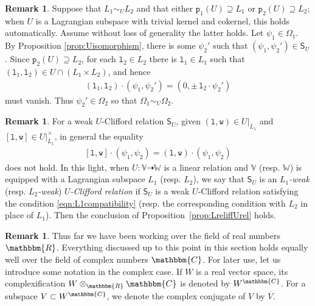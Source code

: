 \documentclass[a4paper, reqno, 11pt]{amsart}
\numberwithin{equation}{section}
\theoremstyle{definition}
\newtheorem{remark}[equation]{Remark}
\newcommand{\rmp}{\mathtt{p}}
\newcommand{\IC}{\mathbbm{C}}
\newcommand{\IR}{\mathbbm{R}}
\newcommand{\IV}{\mathbb{V}}
\newcommand{\IW}{\mathbb{W}}
\newcommand{\sfS}{{\mathsf{S}}}
\newcommand{\rel}{\dashrightarrow}
\theoremstyle{remark}
\begin{document}
\begin{remark}\label{rem:fullrankcase}
    Suppose that $L_1 \sim_U L_2$ and that either $\rmp_1(U) \supseteq L_1$ or $\rmp_2(U) \supseteq L_2$; when $U$ is a Lagrangian subspace with trivial kernel and cokernel, this holds automatically. Assume without loss of generality the latter holds. Let $\psi_1\in\Omega_1$.
    By Proposition \ref{prop:Uisomorphism}, there is some $\psi_2'$ such that $(\psi_1, \psi_2') \in \sfS_U$. Since $\rmp_2(U) \supseteq L_2$, for each $\texttt{l}_2 \in L_2$ there is $\texttt{l}_1 \in L_1$ such that $(\texttt{l}_1, \texttt{l}_2) \in U\cap (L_1 \times L_2)$, and hence
    \begin{align}
        (\texttt{l}_1, \texttt{l}_2) \cdot (\psi_1, \psi_2') = (0, \pm\,\texttt{l}_2 \cdot \psi_2')
    \end{align}
    must vanish. Thus $\psi_2' \in \Omega_2$ so that $\Omega_1 \sim_U \Omega_2$.
\end{remark}

\begin{remark}\label{rem:weakcase}
    For a weak $U$-Clifford relation $\sfS_U$, given $(\texttt{l}, \texttt{w}) \in U|_{L_1}$ and $[\texttt{l},\texttt{w}] \in U|_{L_1}^\times$, in general the equality
    \begin{align}\label{eqn:L1compatibility}
        [\texttt{l},\texttt{w}] \cdot (\psi_1, \psi_2) = (\texttt{l},\texttt{w}) \cdot (\psi_1, \psi_2)
    \end{align}
    does not hold.
    In this light, when $U \colon \IV \rel \IW$ is a linear relation and $\IV$ (resp. $\IW$) is equipped with a Lagrangian subspace $L_1$ (resp. $L_2$), we say that $\sfS_U$ is an \emph{$L_1$-weak} (resp. \emph{$L_2$-weak}) \emph{$U$-Clifford relation} if $\sfS_U$ is a weak $U$-Clifford relation satisfying the condition \eqref{eqn:L1compatibility} (resp. the corresponding condition with $L_2$ in place of $L_1$). Then the conclusion of Proposition~\ref{prop:LreliffUrel} holds.
\end{remark}

\begin{remark}
    Thus far we have been working over the field of real numbers $\IR$. Everything discussed up to this point in this section holds equally well over the field of complex numbers $\IC$. For later use, let us introduce some notation in the complex case. If $W$ is a real vector space, its complexification $W\otimes_\IR \IC$ is denoted by $W^\IC$. For a subspace $V \subset W^\IC$, we denote the complex conjugate of $V$ by $\overline V$.
\end{remark}
\end{document}
